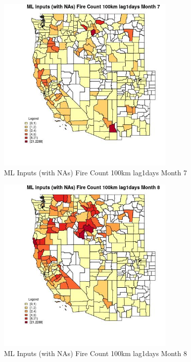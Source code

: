 \begin{figure} 
\centering  
\includegraphics[width=0.77\textwidth]{Code_Outputs/Report_ML_input_PM25_Step4_part_e_de_duplicated_aves_compiled_2019-05-21wNAs_CountyFire_Count_100km_lag1daysmedianMonth7.jpg} 
\caption{\label{fig:Report_ML_input_PM25_Step4_part_e_de_duplicated_aves_compiled_2019-05-21wNAsCountyFire_Count_100km_lag1daysmedianMonth7}ML Inputs (with NAs) Fire Count 100km lag1days Month 7} 
\end{figure} 
 

\begin{figure} 
\centering  
\includegraphics[width=0.77\textwidth]{Code_Outputs/Report_ML_input_PM25_Step4_part_e_de_duplicated_aves_compiled_2019-05-21wNAs_CountyFire_Count_100km_lag1daysmedianMonth8.jpg} 
\caption{\label{fig:Report_ML_input_PM25_Step4_part_e_de_duplicated_aves_compiled_2019-05-21wNAsCountyFire_Count_100km_lag1daysmedianMonth8}ML Inputs (with NAs) Fire Count 100km lag1days Month 8} 
\end{figure} 
 

